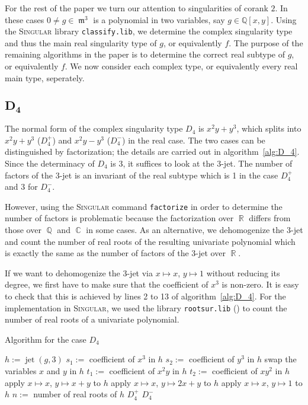 \documentclass[noend]{amsproc}
\theoremstyle{definition}
\newcommand{\Singular}{\textsc{Singular}}
\DeclareMathOperator{\m}{\mathfrak{m}}
\DeclareMathOperator{\jet}{jet}
\DeclareMathOperator{\Q}{\mathbb{Q}}
\DeclareMathOperator{\R}{\mathbb{R}}
\DeclareMathOperator{\C}{\mathbb{C}}
\begin{document}
For the rest of the paper we turn our attention to singularities of corank $2$.
In these cases $0\neq g\in\m^3$ is a polynomial in two variables, say
$g\in\mathbb Q[x,y]$. Using the \textsc{Singular} library {\tt classify.lib},
we determine the complex singularity type and thus the main real singularity
type of $g$, or equivalently $f$. The purpose of the remaining algorithms in
the paper is to determine the correct real subtype of $g$, or equivalently $f$.
We now consider each complex type, or equivalently every real main type,
seperately.

\subsection{$\boldsymbol{D_4}$}

The normal form of the complex singularity type $D_4$ is $x^2y+y^3$, which
splits into $x^2y+y^3$ ($D_4^+$) and $x^2y-y^3$ ($D_4^-$) in the real case.
The two cases can be distinguished by factorization; the details are carried
out in algorithm~\ref{alg:D_4}. Since the determinacy of $D_4$ is $3$, it
suffices to look at the $3$-jet. The number of factors of the 3-jet is an
invariant of the real subtype which is 1 in the case $D_4^+$ and 3 for $D_4^-$.

However, using the \Singular{} command \verb+factorize+ in order to determine
the number of factors is problematic because the factorization over $\R$
differs from those over $\Q$ and $\C$ in some cases. As an alternative, we
dehomogenize the 3-jet and count the number of real roots of the resulting
univariate polynomial which is exactly the same as the number of factors of the
3-jet over $\R$.

If we want to dehomogenize the 3-jet via $x\mapsto x$, $y\mapsto 1$ without
reducing its degree, we first have to make sure that the coefficient of $x^3$
is non-zero. It is easy to check that this is achieved by lines 2 to 13 of
algorithm~\ref{alg:D_4}. For the implementation in \Singular{}, we used the
library \texttt{rootsur.lib} (\cite{roots}) to count the number of real roots
of a univariate polynomial.

\begin{algorithm}[ht]
\caption{\label{alg:D_4}\label{D[4]} Algorithm for the case $D_4$}
\begin{algorithmic}[1]

\REQUIRE{$g\in \m^3\subset\mathbb Q[x,y]$ of complex singularity type $D_4$}
\STATE $h := \jet(g,3)$
\STATE $s_1:=$ coefficient of ${x^3}$ in $h$
\STATE $s_2 :=$ coefficient of ${y^3}$ in $h$
\STATE swap the variables $x$ and $y$ in $h$
\ELSE
\STATE $t_1:=$ coefficient of ${x^2y}$ in $h$
\STATE $t_2:=$ coefficient of ${xy^2}$ in $h$
\STATE apply $x\mapsto x$, $y\mapsto x+y$ to $h$
\ELSE
\STATE apply $x\mapsto x$, $y\mapsto 2x+y$ to $h$
\ENDIF
\ENDIF
\ENDIF
\STATE apply $x\mapsto x$, $y\mapsto 1$ to $h$
\STATE $n :=$ number of real roots of $h$
\RETURN $D_4^+$
\ELSE
\RETURN $D_4^-$
\ENDIF

\end{algorithmic}
\end{algorithm}
\end{document}
